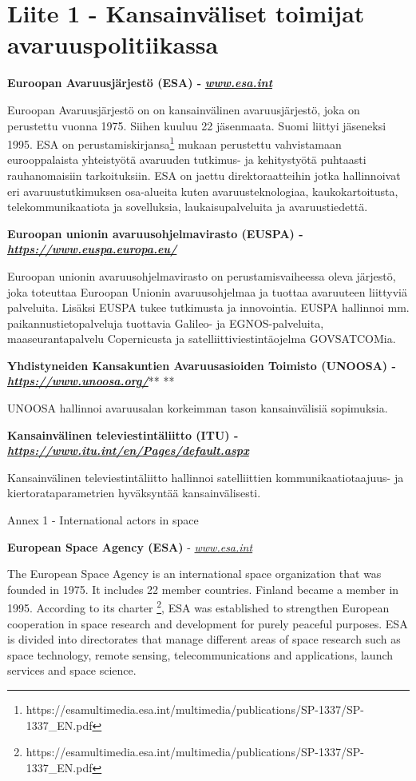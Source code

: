 \documentclass[nobib,finnish,oneside,openany,notoc,a4paper]{tufte-book}
\begin{document}
{\chapter{Liite 1 - Kansainväliset toimijat avaruuspolitiikassa}

\textbf{Euroopan Avaruusjärjestö (ESA) -
}\href{http://www.esa.int}{\textbf{\emph{www.esa.int}}}

Euroopan Avaruusjärjestö on on kansainvälinen avaruusjärjestö, joka on
perustettu vuonna 1975. Siihen kuuluu 22 jäsenmaata. Suomi liittyi
jäseneksi 1995. ESA on perustamiskirjansa\footnote{https://esamultimedia.esa.int/multimedia/publications/SP-1337/SP-1337\_EN.pdf}
mukaan perustettu vahvistamaan eurooppalaista yhteistyötä avaruuden
tutkimus- ja kehitystyötä puhtaasti rauhanomaisiin tarkoituksiin. ESA on
jaettu direktoraatteihin jotka hallinnoivat eri avaruustutkimuksen
osa-alueita kuten avaruusteknologiaa, kaukokartoitusta,
telekommunikaatiota ja sovelluksia, laukaisupalveluita ja
avaruustiedettä.

\textbf{Euroopan unionin avaruusohjelmavirasto (EUSPA) -
}\href{https://www.euspa.europa.eu/}{\textbf{\emph{https://www.euspa.europa.eu/}}}

Euroopan unionin avaruusohjelmavirasto on perustamisvaiheessa oleva
järjestö, joka toteuttaa Euroopan Unionin avaruusohjelmaa ja tuottaa
avaruuteen liittyviä palveluita. Lisäksi EUSPA tukee tutkimusta ja
innovointia. EUSPA hallinnoi mm. paikannustietopalveluja tuottavia
Galileo- ja EGNOS-palveluita, maaseurantapalvelu Copernicusta ja
satelliittiviestintäojelma GOVSATCOMia.

\textbf{Yhdistyneiden Kansakuntien Avaruusasioiden Toimisto (UNOOSA) -
}\href{https://www.unoosa.org/}{\textbf{\emph{https://www.unoosa.org/}}}**
**

UNOOSA hallinnoi avaruusalan korkeimman tason kansainvälisiä sopimuksia.

\textbf{Kansainvälinen televiestintäliitto (ITU) -
}\href{https://www.itu.int/en/Pages/default.aspx}{\textbf{\emph{https://www.itu.int/en/Pages/default.aspx}}}

Kansainvälinen televiestintäliitto hallinnoi satelliittien
kommunikaatiotaajuus- ja kiertorataparametrien hyväksyntää
kansainvälisesti.

\protect\hypertarget{anchor-17}{}{}Annex 1 - International actors in
space

\textbf{European Space Agency (ESA)} -
\href{http://www.esa.int}{\emph{www.esa.int}}

The European Space Agency is an international space organization that
was founded in 1975. It includes 22 member countries. Finland became a
member in 1995. According to its charter \footnote{https://esamultimedia.esa.int/multimedia/publications/SP-1337/SP-1337\_EN.pdf},
ESA was established to strengthen European cooperation in space research
and development for purely peaceful purposes. ESA is divided into
directorates that manage different areas of space research such as space
technology, remote sensing, telecommunications and applications, launch
services and space science.

}
\end{document}
